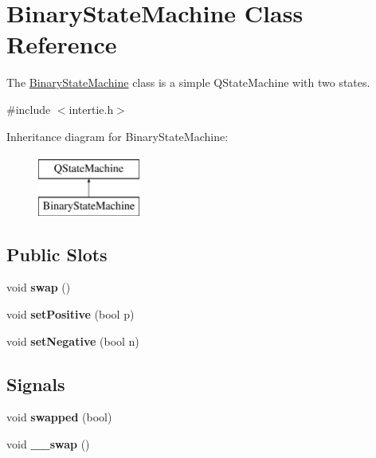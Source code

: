 \hypertarget{class_binary_state_machine}{}\section{Binary\+State\+Machine Class Reference}
\label{class_binary_state_machine}


The \hyperlink{class_binary_state_machine}{Binary\+State\+Machine} class is a simple Q\+State\+Machine with two states.  




{\ttfamily \#include $<$intertie.\+h$>$}

Inheritance diagram for Binary\+State\+Machine\+:\begin{figure}[H]
\begin{center}
\leavevmode
\includegraphics[height=2.000000cm]{class_binary_state_machine}
\end{center}
\end{figure}
\subsection*{Public Slots}
\begin{DoxyCompactItemize}
\item 
\hypertarget{class_binary_state_machine_a797936cea8c62cc1147fdfae5c4668dc}{}\label{class_binary_state_machine_a797936cea8c62cc1147fdfae5c4668dc} 
void {\bfseries swap} ()
\item 
\hypertarget{class_binary_state_machine_a19e75b5bbab7ffd29b18b48f56db1466}{}\label{class_binary_state_machine_a19e75b5bbab7ffd29b18b48f56db1466} 
void {\bfseries set\+Positive} (bool p)
\item 
\hypertarget{class_binary_state_machine_ae3d601827e27a6fa9cac36744c8fe46c}{}\label{class_binary_state_machine_ae3d601827e27a6fa9cac36744c8fe46c} 
void {\bfseries set\+Negative} (bool n)
\end{DoxyCompactItemize}
\subsection*{Signals}
\begin{DoxyCompactItemize}
\item 
\hypertarget{class_binary_state_machine_a2117c089728ebb9b4aa8c1598f655e15}{}\label{class_binary_state_machine_a2117c089728ebb9b4aa8c1598f655e15} 
void {\bfseries swapped} (bool)
\item 
\hypertarget{class_binary_state_machine_adc76e49054c18bfb19de3e2d53da0362}{}\label{class_binary_state_machine_adc76e49054c18bfb19de3e2d53da0362} 
void {\bfseries \+\_\+\+\_\+swap} ()
\end{DoxyCompactItemize}
